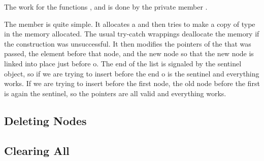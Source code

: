 The work for the functions ,  and
 is done by the private member .

The member is quite simple. It allocates a  and then tries to make
a copy of type in the memory allocated. The usual try-catch wrappings
deallocate the memory if the construction was unsuccessful. It then modifies
the pointers of the  that was passed, the element before that node,
and the new node so that the new node is linked into place just before o. The
end of the list is signaled by the sentinel object, so if we are trying to
insert before the end o is the sentinel and everything works. If we are trying
to insert before the first node, the old node before the first is again the
sentinel, so the pointers are all valid and everything works.

\subsection{Deleting Nodes}

\subsection{Clearing All}

